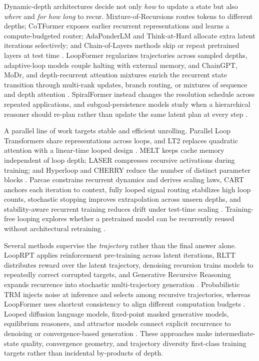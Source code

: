 Dynamic-depth architectures decide not only \emph{how} to update a state but also \emph{where} and \emph{for how long} to recur. Mixture-of-Recursions routes tokens to different depths; CoTFormer exposes earlier recurrent representations and learns a compute-budgeted router; AdaPonderLM and Think-at-Hard allocate extra latent iterations selectively; and Chain-of-Layers methods skip or repeat pretrained layers at test time \citep{bay2025mixture,mohtashami2025cotformer,fu2025thinkathard,li2026programlayers}. LoopFormer regularizes trajectories across sampled depths, adaptive-loop models couple halting with external memory, and ChainGPT, MoDr, and depth-recurrent attention mixtures enrich the recurrent state transition through multi-rank updates, branch routing, or mixtures of sequence and depth attention \citep{jeddi2026loopformer,frey2026adaptive,zheng2026chaingpt,zhang2026modr}. SpiralFormer instead changes the resolution schedule across repeated applications, and subgoal-persistence models study when a hierarchical reasoner should re-plan rather than update the same latent plan at every step \citep{yu2026spiralformer,chadha2026replan}.

A parallel line of work targets stable and efficient unrolling. Parallel Loop Transformers share representations across loops, and LT2 replaces quadratic attention with a linear-time looped design \citep{wu2025parallellooptransformerefficient,deng2026lt2}. MELT keeps cache memory independent of loop depth; LASER compresses recursive activations during training; and Hyperloop and CHERRY reduce the number of distinct parameter blocks \citep{cakar2026laser,zeitoun2026hyperloop,kwon2026cherry}. Parcae constrains recurrent dynamics and derives scaling laws, CART anchors each iteration to context, fully looped signal routing stabilizes high loop counts, stochastic stopping improves extrapolation across unseen depths, and stability-aware recurrent training reduces drift under test-time scaling \citep{prairie2026parcae,capps2026cart,fu2026fullylooped,kuo2026stochasticstopping}. Training-free looping explores whether a pretrained model can be recurrently reused without architectural retraining \citep{chen2026trainingfree}.

Several methods supervise the \emph{trajectory} rather than the final answer alone. LoopRPT applies reinforcement pre-training across latent iterations, RLTT distributes reward over the latent trajectory, denoising recursion trains models to repeatedly correct corrupted targets, and Generative Recursive Reasoning expands recurrence into stochastic multi-trajectory generation \citep{tang2026looprpt,cameron2026denoisingrecursion,baek2026gram}. Probabilistic TRM injects noise at inference and selects among recursive trajectories, whereas LoopFormer uses shortcut consistency to align different computation budgets \citep{sghaier2026ptrm,jeddi2026loopformer}. Looped diffusion language models, fixed-point masked generative models, equilibrium reasoners, and attractor models connect explicit recurrence to denoising or convergence-based generation \citep{miele2026fixedpointmasked,feinashley2026attractor}. These approaches make intermediate-state quality, convergence geometry, and trajectory diversity first-class training targets rather than incidental by-products of depth.

